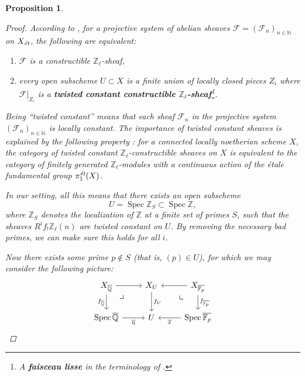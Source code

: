 \documentclass{article}
\DeclareMathOperator{\Spec}{Spec}
\newcommand{\FF}{\mathbb{F}}
\newcommand{\NN}{\mathbb{N}}
\newcommand{\QQ}{\mathbb{Q}}
\newcommand{\ZZ}{\mathbb{Z}}
\newcommand{\et}{\text{\it ét}}
\newcommand{\tikzpb}{\ar[phantom,pos=0.2]{dr}{\text{\large$\lrcorner$}}}
\newcommand{\tikzpbur}{\ar[phantom,pos=0.2]{dl}{\text{\large$\llcorner$}}}
\newtheorem{proposition}[theorem]{Proposition}
\theoremstyle{definition}
\numberwithin{equation}{section}
\begin{document}
\begin{proposition}
\begin{proof}
    According to \cite[Exposé~VI, 1.2.6]{SGA5}, for a projective system of
    abelian sheaves $\mathcal{F} = (\mathcal{F}_n)_{n\in\NN}$ on $X_\et$, the
    following are equivalent:
    \begin{enumerate}
    \item[1)] $\mathcal{F}$ is a constructible $\ZZ_\ell$-sheaf,

    \item[2)] every open subscheme $U\subset X$ is a finite union of locally
      closed pieces $Z_i$ where $\left.\mathcal{F}\right|_{Z_i}$ is a
      \textbf{twisted constant constructible $\ZZ_\ell$-sheaf}\footnote{A
        \textbf{faisceau lisse} in the terminology of
        \cite[Rapport]{SGA4-1-2}.}.
    \end{enumerate}

    Being ``twisted constant'' means that each sheaf $\mathcal{F}_n$ in the
    projective system $(\mathcal{F}_n)_{n\in\NN}$ is locally constant. The
    importance of twisted constant sheaves is explained by the following
    property \cite[Exposé~VI, 1.2.4, 1.2.5]{SGA5}: for a connected locally
    noetherian scheme $X$, the category of twisted constant
    $\ZZ_\ell$-constructible sheaves on $X$ is equivalent to the category of
    finitely generated $\ZZ_\ell$-modules with a continuous action of the étale
    fundamental group $\pi_1^\text{\it ét} (X)$.

    In our setting, all this means that there exists an open subscheme
    $$U = \Spec \ZZ_S \subset \Spec \ZZ,$$
    where $\ZZ_S$ denotes the localization of $\ZZ$ at a finite set of primes
    $S$, such that the sheaves $R^i f_! \ZZ_\ell (n)$ are twisted constant on
    $U$. By removing the necessary bad primes, we can make sure this holds
    for all $i$.

    Now there exists some prime $p \notin S$ (that is, $(p) \in U$), for which
    we may consider the following picture:
    \[ \begin{tikzcd}
      X_{\overline{\QQ}} \ar{r}\tikzpb\ar{d}[swap]{f_{\overline{\QQ}}} & X_U \ar{d}{f_U} & X_{\overline{\FF_p}} \ar{l}\ar{d}{f_{\overline{\FF_p}}}\tikzpbur \\
      \Spec \overline{\QQ} \ar{r}[swap]{\overline{\eta}} & U & \Spec \overline{\FF_p} \ar{l}{\overline{x}}
    \end{tikzcd} \]


\end{proof}
\end{proposition}
\end{document}
